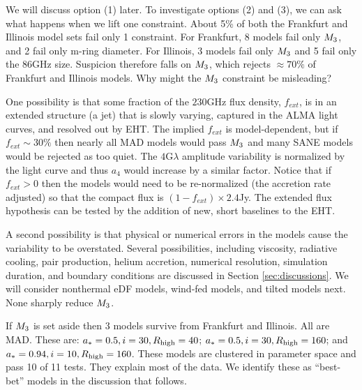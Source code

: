 We will discuss option (1) later.  To investigate options (2) and (3), we can ask what happens when we lift one constraint.  About 5\% of both the Frankfurt and Illinois model sets fail only 1 constraint.  For Frankfurt, 8 models fail only $M_{3}$, and 2 fail only m-ring diameter.  For Illinois, 3 models fail only $M_{3}$ and 5 fail only the 86GHz size.  Suspicion therefore falls on $M_{3}$, which rejects $\approx 70\%$ of Frankfurt and Illinois models.  Why might the $M_{3}$ constraint be misleading?


One possibility is that some fraction of the $230$GHz flux density, $f_{ext}$, is in an extended structure (a jet) that is slowly varying, captured in the ALMA light curves, and resolved out by EHT.  The implied $f_{ext}$ is model-dependent, but if $f_{ext} \sim 30\%$ then nearly all MAD models would pass $M_{3}$ and many SANE models would be rejected as too quiet.  The $4$G$\lambda$ amplitude variability is normalized by the light curve and thus $a_4$ would increase by a similar factor.  Notice that if $f_{ext} > 0$ then the models would need to be re-normalized (the accretion rate adjusted) so that the compact flux is $(1 - f_{ext}) \times 2.4$Jy.  The extended flux hypothesis can be tested by the addition of new, short baselines to the EHT.

A second possibility is that physical or numerical errors in the models cause the variability to be overstated.  Several possibilities, including viscosity, radiative cooling, pair production, helium accretion, numerical resolution, simulation duration, and boundary conditions are discussed in Section \ref{sec:discussions}.  We will consider nonthermal eDF models, wind-fed models, and tilted models next.  None sharply reduce $M_{3}$.

If $M_{3}$ is set aside then 3 models survive from Frankfurt and Illinois.  All are MAD.  These are: $a_* = 0.5, i = 30, R_\mathrm{high} = 40$; $a_* = 0.5, i = 30, R_\mathrm{high} = 160$; and $a_* = 0.94, i = 10, R_\mathrm{high} = 160$.  These models are clustered in parameter space and pass 10 of 11 tests.  They explain most of the data.  We identify these as ``best-bet'' models in the discussion that follows.


